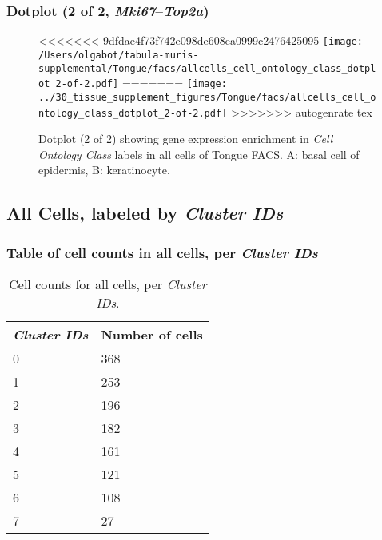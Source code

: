 \clearpage

\subsubsection{Dotplot (2 of 2, \emph{Mki67}--\emph{Top2a})}
\begin{figure}[h]
\centering
<<<<<<< 9dfdae4f73f742e098de608ea0999c2476425095
\texttt{[image: /Users/olgabot/tabula-muris-supplemental/Tongue/facs/allcells\_cell\_ontology\_class\_dotplot\_2-of-2.pdf]}
=======
\texttt{[image: ../30\_tissue\_supplement\_figures/Tongue/facs/allcells\_cell\_ontology\_class\_dotplot\_2-of-2.pdf]}
>>>>>>> autogenrate tex

\caption{ Dotplot (2 of 2)  showing gene expression enrichment in \emph{Cell Ontology Class} labels in all cells of Tongue FACS. A: basal cell of epidermis, B: keratinocyte.}
\end{figure}


\clearpage

\subsection{All Cells, labeled by \emph{Cluster IDs}}
\subsubsection{Table of cell counts in all cells, per \emph{Cluster IDs}}\begin{table}[h]
\centering
\label{my-label}
\begin{tabular}{@{}ll@{}}
\toprule

\emph{Cluster IDs}& Number of cells \\ \midrule
0 & 368 \\

1 & 253 \\

2 & 196 \\

3 & 182 \\

4 & 161 \\

5 & 121 \\

6 & 108 \\

7 & 27 \\
\bottomrule
\end{tabular}
\caption{Cell counts for all cells, per \emph{Cluster IDs}.}
\end{table}

